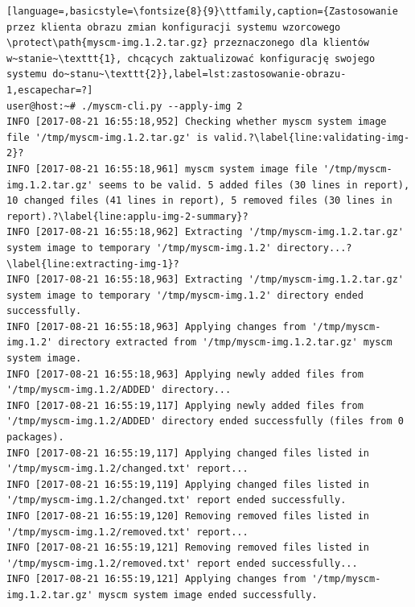 \documentclass[thesis]{subfiles}
\begin{document}
\begin{lstlisting}[language=,basicstyle=\fontsize{8}{9}\ttfamily,caption={Zastosowanie przez klienta obrazu zmian konfiguracji systemu wzorcowego \protect\path{myscm-img.1.2.tar.gz} przeznaczonego dla klientów w~stanie~\texttt{1}, chcących zaktualizować konfigurację swojego systemu do~stanu~\texttt{2}},label=lst:zastosowanie-obrazu-1,escapechar=?]
user@host:~# ./myscm-cli.py --apply-img 2
INFO [2017-08-21 16:55:18,952] Checking whether myscm system image file '/tmp/myscm-img.1.2.tar.gz' is valid.?\label{line:validating-img-2}?
INFO [2017-08-21 16:55:18,961] myscm system image file '/tmp/myscm-img.1.2.tar.gz' seems to be valid. 5 added files (30 lines in report), 10 changed files (41 lines in report), 5 removed files (30 lines in report).?\label{line:applu-img-2-summary}?
INFO [2017-08-21 16:55:18,962] Extracting '/tmp/myscm-img.1.2.tar.gz' system image to temporary '/tmp/myscm-img.1.2' directory...?\label{line:extracting-img-1}?
INFO [2017-08-21 16:55:18,963] Extracting '/tmp/myscm-img.1.2.tar.gz' system image to temporary '/tmp/myscm-img.1.2' directory ended successfully.
INFO [2017-08-21 16:55:18,963] Applying changes from '/tmp/myscm-img.1.2' directory extracted from '/tmp/myscm-img.1.2.tar.gz' myscm system image.
INFO [2017-08-21 16:55:18,963] Applying newly added files from '/tmp/myscm-img.1.2/ADDED' directory...
INFO [2017-08-21 16:55:19,117] Applying newly added files from '/tmp/myscm-img.1.2/ADDED' directory ended successfully (files from 0 packages).
INFO [2017-08-21 16:55:19,117] Applying changed files listed in '/tmp/myscm-img.1.2/changed.txt' report...
INFO [2017-08-21 16:55:19,119] Applying changed files listed in '/tmp/myscm-img.1.2/changed.txt' report ended successfully.
INFO [2017-08-21 16:55:19,120] Removing removed files listed in '/tmp/myscm-img.1.2/removed.txt' report...
INFO [2017-08-21 16:55:19,121] Removing removed files listed in '/tmp/myscm-img.1.2/removed.txt' report ended successfully...
INFO [2017-08-21 16:55:19,121] Applying changes from '/tmp/myscm-img.1.2.tar.gz' myscm system image ended successfully.
\end{lstlisting}
\end{document}
